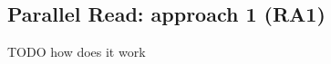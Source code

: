 \documentclass[twocolumn, switch]{article} %
\begin{document}

\subsection{Parallel Read: approach 1 (RA1)}
TODO how does it work
\end{document}
